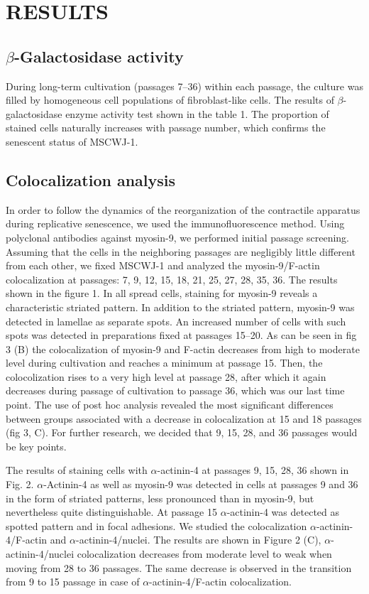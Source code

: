 \documentclass[alpha-refs]{wiley-article}
\begin{document}
\section{RESULTS}

\subsection{$\beta$-Galactosidase activity}

During long-term cultivation (passages 7--36) within each passage, the culture was filled by homogeneous cell populations of fibroblast-like cells.
The results of $\beta$-galactosidase enzyme activity test shown in the table 1.
The proportion of stained cells naturally increases with passage number, which confirms the senescent status of MSCWJ-1.

\subsection{Colocalization analysis}

In order to follow the dynamics of the reorganization of the contractile apparatus during replicative senescence, we used the immunofluorescence method.
Using polyclonal antibodies against myosin-9, we performed initial passage screening.
Assuming that the cells in the neighboring passages are negligibly little different from each other, we fixed MSCWJ-1 and analyzed the myosin-9/F-actin colocalization at passages: 7, 9, 12, 15, 18, 21, 25, 27, 28, 35, 36.
The results shown in the figure 1.
In all spread cells, staining for myosin-9 reveals a characteristic striated pattern.
In addition to the striated pattern, myosin-9 was detected in lamellae as separate spots.
An increased number of cells with such spots was detected in preparations fixed at passages 15--20.
As can be seen in fig 3 (B) the colocalization of myosin-9 and F-actin decreases from high to moderate level during cultivation and reaches a minimum at passage 15.
Then, the colocolization rises to a very high level at passage 28, after which it again decreases during passage of cultivation to passage 36, which was our last time point.
The use of post hoc analysis revealed the most significant differences between groups associated with a decrease in colocalization at 15 and 18 passages (fig 3, C).
For further research, we decided that 9, 15, 28, and 36 passages would be key points.

The results of staining cells with $\alpha$-actinin-4 at passages 9, 15, 28, 36 shown in Fig. 2.
$\alpha$-Actinin-4 as well as myosin-9 was detected in cells at passages 9 and 36 in the form of striated patterns, less pronounced than in myosin-9, but nevertheless quite distinguishable.
At passage 15 $\alpha$-actinin-4 was detected as spotted pattern and in focal adhesions.
We studied the colocalization $\alpha$-actinin-4/F-actin and $\alpha$-actinin-4/nuclei.
The results are shown in Figure 2 (C), $\alpha$-actinin-4/nuclei colocalization decreases from moderate level to weak when moving from 28 to 36 passages.
The same decrease is observed in the transition from 9 to 15 passage in case of $\alpha$-actinin-4/F-actin colocalization.
\end{document}
